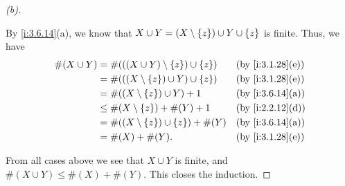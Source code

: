 \begin{proof}[(b)]
\begin{itemize}
          By \cref{i:3.6.14}(a), we know that \(X \cup Y = (X \setminus \left\lbrace z\right\rbrace) \cup Y \cup \left\lbrace z\right\rbrace\) is finite.
          Thus, we have
          \begin{align*}
            \#(X \cup Y) & = \#(((X \cup Y) \setminus \set{z}) \cup \set{z}) &  & \by{i:3.1.28}[e] \\
                         & = \#(((X \setminus \set{z}) \cup Y) \cup \set{z}) &  & \by{i:3.1.28}[e] \\
                         & = \#((X \setminus \set{z}) \cup Y) + 1            &  & \by{i:3.6.14}[a] \\
                         & \leq \#(X \setminus \set{z}) + \#(Y) + 1          &  & \by{i:2.2.12}[d] \\
                         & = \#((X \setminus \set{z}) \cup \set{z}) + \#(Y)  &  & \by{i:3.6.14}[a] \\
                         & = \#(X) + \#(Y).                                  &  & \by{i:3.1.28}[e]
          \end{align*}
  \end{itemize}
  From all cases above we see that \(X \cup Y\) is finite, and \(\#(X \cup Y) \leq \#(X) + \#(Y)\).
  This closes the induction.


\end{proof}
